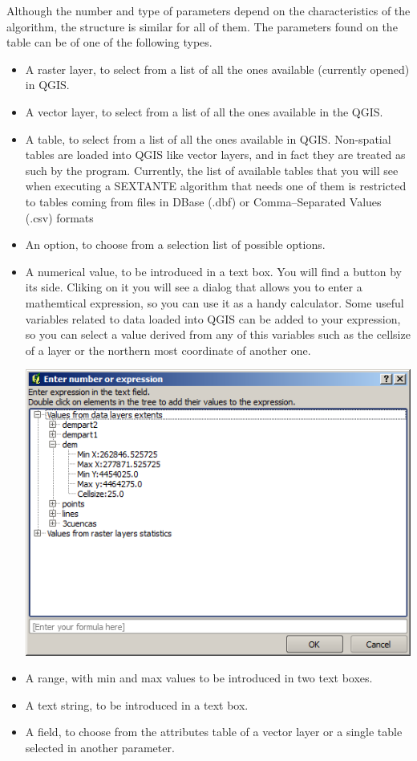 Although the number and type of parameters depend on the characteristics of the algorithm, the structure is similar for all of them. The parameters found on the table can be of one of the following types.

\begin{itemize}
	\item A raster layer, to select from a list of all the ones available (currently opened) in QGIS.
	\item A vector layer, to select from a list of all the ones available in the QGIS.
	\item A table, to select from a list of all the ones available in QGIS. Non-spatial tables are loaded into QGIS like vector layers, and in fact they are treated as such by the program. Currently, the list of available tables that you will see when executing a SEXTANTE algorithm that needs one of them is restricted to tables coming from files in DBase (.dbf) or Comma--Separated Values (.csv) formats
	\item An option, to choose from a selection list of possible options. 	
	\item A numerical value, to be introduced in a text box. You will find a button by its side. Cliking on it you will see a dialog that allows you to enter a mathemtical expression, so you can use it as a handy calculator. Some useful variables related to data loaded into QGIS can be added to your expression, so you can select a value derived from any of this variables such as the cellsize of a layer or the northern most coordinate of another one.
	\begin{center}
\includegraphics[width=.6\columnwidth]{number_selector.png}
\end{center}
	\item A range, with min and max values to be introduced in two text boxes.
	\item A text string, to be introduced in a text box.
	\item A field, to choose from the attributes table of a vector layer or a single table selected in another parameter.

\end{itemize}
